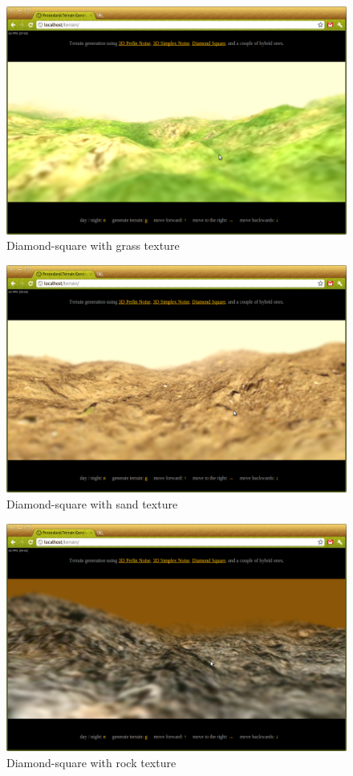 \begin{figure}
	\center
	\includegraphics[scale=0.4]{images/demo_1_1.png}
	\caption{Diamond-square with grass texture}
	\label{fig:demo_1_1}
\end{figure}
\begin{figure}
	\center
	\includegraphics[scale=0.4]{images/demo_1_2.png}
	\caption{Diamond-square with sand texture}
	\label{fig:demo_1_2}
\end{figure}
\begin{figure}
	\center
	\includegraphics[scale=0.4]{images/demo_1_3.png}
	\caption{Diamond-square with rock texture}
	\label{fig:demo_1_3}
\end{figure}

